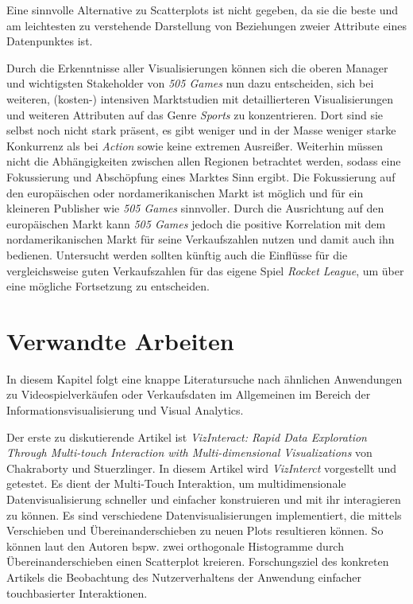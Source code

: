 \documentclass[usegeometry=true]{scrartcl}
\begin{document}
Eine sinnvolle Alternative zu Scatterplots ist nicht gegeben, da sie die beste und am leichtesten zu verstehende Darstellung von Beziehungen zweier Attribute eines Datenpunktes ist. 

Durch die Erkenntnisse aller Visualisierungen können sich die oberen Manager und wichtigsten Stakeholder von \textit{505 Games} nun dazu entscheiden, sich bei weiteren, (kosten-) intensiven Marktstudien mit detaillierteren Visualisierungen und weiteren Attributen auf das Genre \textit{Sports} zu konzentrieren. 
Dort sind sie selbst noch nicht stark präsent, es gibt weniger und in der Masse weniger starke Konkurrenz als bei \textit{Action} sowie keine extremen Ausreißer. 
Weiterhin müssen nicht die Abhängigkeiten zwischen allen Regionen betrachtet werden, sodass eine Fokussierung und Abschöpfung eines Marktes Sinn ergibt. 
Die Fokussierung auf den europäischen oder nordamerikanischen Markt ist möglich und für ein kleineren Publisher wie \textit{505 Games} sinnvoller. 
Durch die Ausrichtung auf den europäischen Markt kann \textit{505 Games} jedoch die positive Korrelation mit dem nordamerikanischen Markt für seine Verkaufszahlen nutzen und damit auch ihn bedienen.
Untersucht werden sollten künftig auch die Einflüsse für die vergleichsweise guten Verkaufszahlen für das eigene Spiel \textit{Rocket League}, um über eine mögliche Fortsetzung zu entscheiden.
 
\section{Verwandte Arbeiten}
In diesem Kapitel folgt eine knappe Literatursuche nach ähnlichen Anwendungen zu Videospielverkäufen oder Verkaufsdaten im Allgemeinen im Bereich der Informationsvisualisierung und Visual Analytics. 

Der erste zu diskutierende Artikel ist \textit{VizInteract: Rapid Data Exploration Through Multi-touch Interaction with Multi-dimensional Visualizations} von Chakraborty und Stuerzlinger.\cite{Chakraborty.2021}
In diesem Artikel wird \textit{VizInterct} vorgestellt und getestet. 
Es dient der Multi-Touch Interaktion, um multidimensionale Datenvisualisierung schneller und einfacher konstruieren und mit ihr interagieren zu können.
Es sind verschiedene Datenvisualisierungen implementiert, die mittels Verschieben und Übereinanderschieben zu neuen Plots resultieren können. 
So können laut den Autoren bspw. zwei orthogonale Histogramme durch Übereinanderschieben einen Scatterplot kreieren. 
Forschungsziel des konkreten Artikels die Beobachtung des Nutzerverhaltens der Anwendung einfacher touchbasierter Interaktionen.
\end{document}
